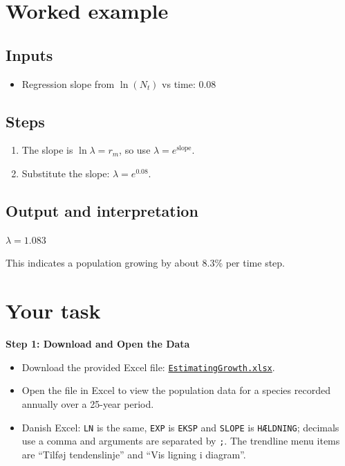\documentclass[
  a4paper]{book}
\providecommand{\tightlist}{%
  \setlength{\itemsep}{0pt}\setlength{\parskip}{0pt}}
\begin{document}
\section{Worked example}\label{worked-example-2}

\subsection{Inputs}\label{inputs-2}

\begin{itemize}
\tightlist
\item
  Regression slope from \(\ln(N_t)\) vs time: \(0.08\)
\end{itemize}

\subsection{Steps}\label{steps-2}

\begin{enumerate}
\def\labelenumi{\arabic{enumi}.}
\tightlist
\item
  The slope is \(\ln \lambda = r_m\), so use \(\lambda = e^{\text{slope}}\).
\item
  Substitute the slope: \(\lambda = e^{0.08}\).
\end{enumerate}

\subsection{Output and interpretation}\label{output-and-interpretation-2}

\(\lambda = 1.083\)

This indicates a population growing by about 8.3\% per time step.

\section{Your task}\label{your-task-3}

\textbf{Step 1: Download and Open the Data}

\begin{itemize}
\tightlist
\item
  Download the provided Excel file: \href{https://www.dropbox.com/scl/fi/k9z32wndllofihsyhj728/EstimatingGrowth.xlsx?rlkey=7gukyzvdm4pv1wsbnljfymvx1&dl=1}{\texttt{EstimatingGrowth.xlsx}}.
\item
  Open the file in Excel to view the population data for a species recorded annually over a 25-year period.
\item
  Danish Excel: \texttt{LN} is the same, \texttt{EXP} is \texttt{EKSP} and \texttt{SLOPE} is \texttt{HÆLDNING}; decimals use a comma and arguments are separated by \texttt{;}. The trendline menu items are ``Tilføj tendenslinje'' and ``Vis ligning i diagram''.
\end{itemize}
\end{document}
